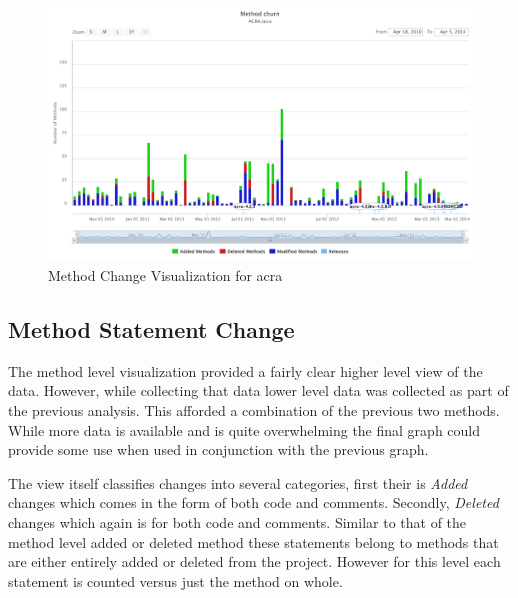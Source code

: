 
\begin{landscape}
\thispagestyle{empty}
 \begin{figure}
  \centering
    \includegraphics[width=1.5\textwidth]{images/method_visual_acra}
    \caption{Method Change Visualization for acra}
    \label{fig:method_visual_acra}
 \end{figure}
\end{landscape}
\thispagestyle{plain}


\subsection{Method Statement Change}

The method level visualization provided a fairly clear higher level view of the data. However, while collecting that data lower level data was collected as part of the previous analysis. This afforded a combination of the previous two methods. While more data is available and is quite overwhelming the final graph could provide some use when used in conjunction with the previous graph.

The view itself classifies changes into several categories, first their is \textit{Added} changes which comes in the form of both code and comments. Secondly, \textit{Deleted} changes which again is for both code and comments. Similar to that of the method level added or deleted method these statements belong to methods that are either entirely added or deleted from the project. However for this level each statement is counted versus just the method on whole.


